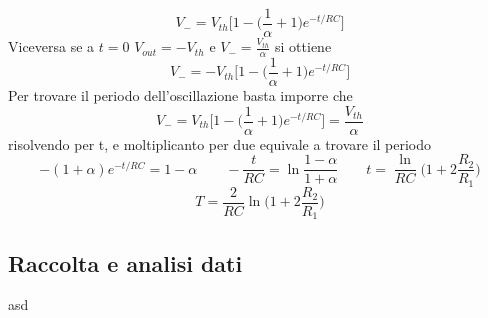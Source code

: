 \documentclass{article}
\begin{document}
			\[
				V_-=V_{th}\bigg[1-\bigg(\frac{1}{\alpha}+1\bigg)e^{-t/RC}\bigg]
			\]
			Viceversa se a $t=0$ $V_{out}=-V_{th}$ e $V_-=\frac{V_{th}}{\alpha}$ si ottiene
			\[
				V_-=-V_{th}\bigg[1-\bigg(\frac{1}{\alpha}+1\bigg)e^{-t/RC}\bigg]
			\]
			Per trovare il periodo dell'oscillazione basta imporre che 
			\[
				V_-=V_{th}\bigg[1-\bigg(\frac{1}{\alpha}+1\bigg)e^{-t/RC}\bigg]=\frac{V_{th}}{\alpha}
			\]
			risolvendo per t, e moltiplicanto per due equivale a trovare il periodo
			\[
				-(1+\alpha)e^{-t/RC}=1-\alpha\qquad -\frac{t}{RC}=\ln\frac{1-\alpha}{1+\alpha}\qquad t=\frac{\ln}{RC}\bigg(1+2\frac{R_2}{R_1} \bigg)
			\]
			\begin{equation}
				T=\frac{2}{RC}\ln\bigg(1+2\frac{R_2}{R_1} \bigg)
			\end{equation}
		\subsection{Raccolta e analisi dati}
		asd
\end{document}
